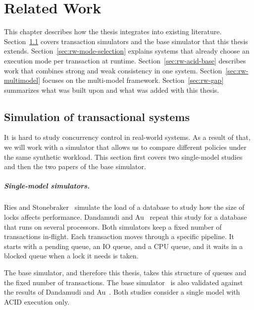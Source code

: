 
\chapter{Related Work}\label{chapter:related-work}

This chapter describes how the thesis integrates into existing literature.
Section~\ref{sec:rw-simulators} covers transaction simulators and the base
simulator that this thesis extends. Section~\ref{sec:rw-mode-selection} explains
systems that already choose an execution mode per transaction at runtime.
Section~\ref{sec:rw-acid-base} describes work that combines strong and weak
consistency in one system. Section~\ref{sec:rw-multimodel} focuses on the
multi-model framework. Section~\ref{sec:rw-gap} summarizes what was built upon
and what was added with this thesis.

\section{Simulation of transactional systems}\label{sec:rw-simulators}

It is hard to study concurrency control in real-world systems. As a result of
that, we will work with a simulator that allows us to compare different policies under
the same synthetic workload. This section first covers two single-model studies
and then the two papers of the base simulator.

\paragraph{Single-model simulators.} Ries and Stonebraker~\cite{ries1979locking}
simulate the load of a database to study how the size of locks affects
performance. Dandamudi and Au~\cite{dandamudi1991locking} repeat this study for
a database that runs on several processors. Both simulators keep a fixed number
of transactions in-flight. Each transaction moves through a specific pipeline.
It starts with a pending queue, an IO queue, and a CPU queue, and it waits in a
blocked queue when a lock it needs is taken.

The base simulator, and therefore this thesis, takes this structure of queues
and the fixed number of transactions. The base simulator~\cite{zacouris2026mxs} is also validated
against the results of Dandamudi and Au~\cite{dandamudi1991locking}. Both studies
consider a single model with ACID execution only.

